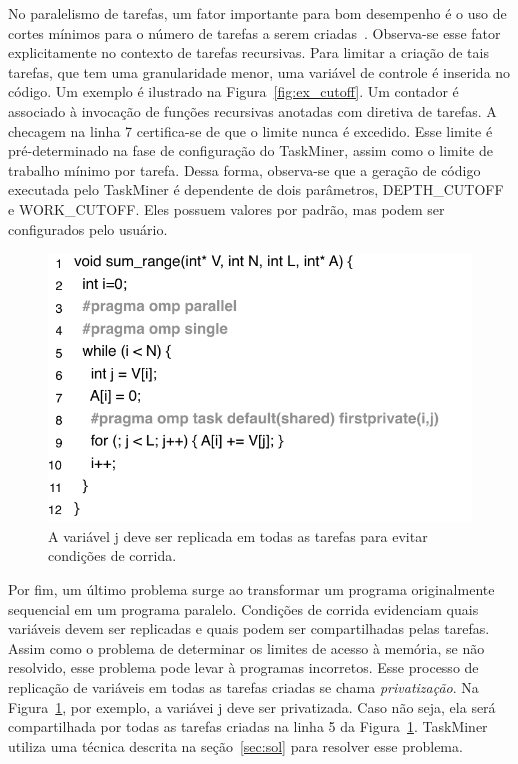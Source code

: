 \documentclass[sigplan,10pt,review]{acmart}
\newcommand\Taskminer{\mbox{\textsf{TaskMiner}}}
\begin{document}
No paralelismo de tarefas, um fator importante para bom desempenho
é o uso de cortes mínimos para o número de tarefas a serem criadas~\cite{Duran08b}. 
Observa-se esse fator explicitamente no contexto de tarefas recursivas. 
Para limitar a criação de tais tarefas, que tem uma granularidade menor,
uma variável de controle é inserida no código. 
Um exemplo é ilustrado na Figura~\ref{fig:ex_cutoff}. 
Um contador é associado à invocação de funções recursivas anotadas com diretiva de tarefas. 
A checagem na linha 7 certifica-se de que o limite
nunca é excedido. Esse limite é pré-determinado na fase de configuração do 
{\Taskminer}, assim como o limite de trabalho mínimo
por tarefa. Dessa forma, observa-se que a geração 
de código executada pelo {\Taskminer} é dependente de dois parâmetros,
\textsf{DEPTH\_CUTOFF} e \textsf{WORK\_CUTOFF}. 
Eles possuem valores por padrão, mas podem ser configurados pelo usuário.

\begin{figure}[h!]
\begin{center}
\includegraphics[width=1\columnwidth]{images/ex_privatize}
\caption{A variável \textsf{j} deve ser replicada em todas as tarefas para evitar condições de corrida.}
\label{fig:ex_privatize}
\end{center}
\end{figure}

Por fim,  um último problema surge ao transformar um programa originalmente
sequencial em um programa paralelo. Condições de corrida evidenciam
quais variáveis devem ser replicadas e
quais podem ser compartilhadas pelas tarefas. 
Assim como o problema de determinar os limites de acesso à memória, 
se não resolvido, esse problema pode levar à programas incorretos.
Esse processo de replicação de variáveis em todas as tarefas criadas se chama \textit{privatização}. 
Na Figura~\ref{fig:ex_privatize}, por exemplo,
a variávei \textsf{j} deve ser privatizada. 
Caso não seja, ela será compartilhada por todas as tarefas 
criadas na linha 5 da Figura~\ref{fig:ex_privatize}. 
{\Taskminer} utiliza uma técnica descrita na seção~\ref{sec:sol} 
para resolver esse problema.	
\end{document}
